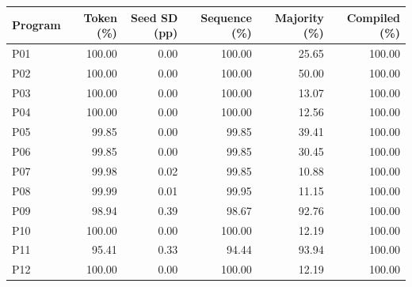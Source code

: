\begin{center}\small
\begin{tabular}{@{}lrrrrr@{}}
\toprule
Program & Token (\%) & Seed SD (pp) & Sequence (\%) & Majority (\%) & Compiled (\%) \\
\midrule
P01 & 100.00 & 0.00 & 100.00 & 25.65 & 100.00 \\
P02 & 100.00 & 0.00 & 100.00 & 50.00 & 100.00 \\
P03 & 100.00 & 0.00 & 100.00 & 13.07 & 100.00 \\
P04 & 100.00 & 0.00 & 100.00 & 12.56 & 100.00 \\
P05 & 99.85 & 0.00 & 99.85 & 39.41 & 100.00 \\
P06 & 99.85 & 0.00 & 99.85 & 30.45 & 100.00 \\
P07 & 99.98 & 0.02 & 99.85 & 10.88 & 100.00 \\
P08 & 99.99 & 0.01 & 99.95 & 11.15 & 100.00 \\
P09 & 98.94 & 0.39 & 98.67 & 92.76 & 100.00 \\
P10 & 100.00 & 0.00 & 100.00 & 12.19 & 100.00 \\
P11 & 95.41 & 0.33 & 94.44 & 93.94 & 100.00 \\
P12 & 100.00 & 0.00 & 100.00 & 12.19 & 100.00 \\
\bottomrule
\end{tabular}
\end{center}
